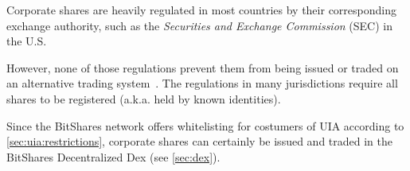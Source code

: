 Corporate shares are heavily regulated in most countries by their corresponding
exchange authority, such as the \emph{Securities and Exchange Commission} (SEC)
in the U.S.

However, none of those regulations prevent them from being issued or traded on
an alternative trading system~\cite{altTrade}. The regulations in many
jurisdictions require all shares to be registered (a.k.a. held by known
identities). 

Since the BitShares network offers whitelisting for costumers of UIA according
to \cref{sec:uia:restrictions}, corporate shares can certainly be issued and
traded in the BitShares Decentralized Dex (see \cref{sec:dex}).

